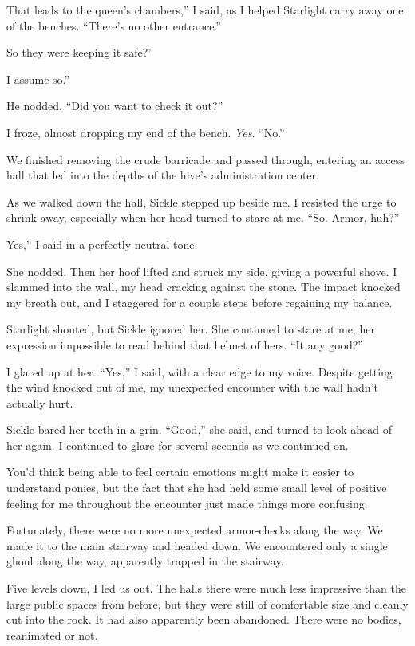 \leavevmode{}That leads to the queen’s chambers,” I said, as I helped Starlight carry away one of the benches. “There’s no other entrance.”

\leavevmode{}So they were keeping it safe?”

\leavevmode{}I assume so.”

He nodded. “Did you want to check it out?”

I froze, almost dropping my end of the bench. \textit{Yes}. “No.”

We finished removing the crude barricade and passed through, entering an access hall that led into the depths of the hive’s administration center.

As we walked down the hall, Sickle stepped up beside me. I resisted the urge to shrink away, especially when her head turned to stare at me. “So. Armor, huh?”

\leavevmode{}Yes,” I said in a perfectly neutral tone.

She nodded. Then her hoof lifted and struck my side, giving a powerful shove. I slammed into the wall, my head cracking against the stone. The impact knocked my breath out, and I staggered for a couple steps before regaining my balance.

Starlight shouted, but Sickle ignored her. She continued to stare at me, her expression impossible to read behind that helmet of hers. “It any good?”

I glared up at her. “Yes,” I said, with a clear edge to my voice. Despite getting the wind knocked out of me, my unexpected encounter with the wall hadn’t actually hurt.

Sickle bared her teeth in a grin. “Good,” she said, and turned to look ahead of her again. I continued to glare for several seconds as we continued on.

You’d think being able to feel certain emotions might make it easier to understand ponies, but the fact that she had held some small level of positive feeling for me throughout the encounter just made things more confusing.

Fortunately, there were no more unexpected armor-checks along the way. We made it to the main stairway and headed down. We encountered only a single ghoul along the way, apparently trapped in the stairway.

Five levels down, I led us out. The halls there were much less impressive than the large public spaces from before, but they were still of comfortable size and cleanly cut into the rock. It had also apparently been abandoned. There were no bodies, reanimated or not.

